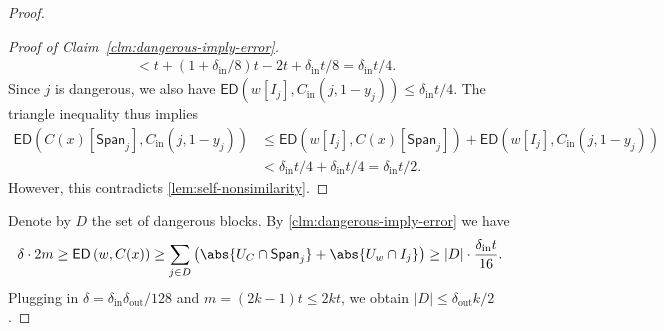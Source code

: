 \documentclass[10pt,a4paper]{article}
\theoremstyle{remark}
\newcommand{\tuple}[1]{\ensuremath{\left(#1\right)}}
\newcommand{\tp}{\tuple}
\newcommand{\ED}{\ensuremath{\mathsf{ED}}\xspace}%
\newcommand{\dout}{\delta_{\text{out}}}
\newcommand{\Cin}{C_{\text{in}}}
\newcommand{\din}{\delta_{\text{in}}}
\begin{document}
\begin{proof}
\begin{proof}[Proof of Claim~\ref{clm:dangerous-imply-error}]
\begin{align*}
			&< t + (1+\din/8)t - 2t + \din t/8 = \din t/4.
		\end{align*}
		Since $j$ is dangerous, we also have $\ED\tp{w[I_j], \Cin(j, 1-y_j)}\le \din t/4$. The triangle inequality thus implies
		\begin{align*}
			\ED\tp{C(x)[{\textsf{Span}_j}], \Cin(j, 1-y_j)} &\le \ED\tp{w[{I_j}], C(x)[{\textsf{Span}_j}]} + \ED\tp{w[{I_j}], \Cin(j, 1-y_j)}\\
			&< \din t/4 + \din t/4 = \din t/2.
		\end{align*}
		However, this contradicts \cref{lem:self-nonsimilarity}.
	\end{proof}
	
	Denote by $D$ the set of dangerous blocks. By \cref{clm:dangerous-imply-error} we have
	\begin{align*}
	\delta \cdot 2m \ge \ED\tp{w, C(x)} \ge \sum_{j \in D}\tp{\abs{U_C \cap \textsf{Span}_j} + \abs{U_w \cap I_j}} \ge |D| \cdot \frac{\din t}{16}.
	\end{align*}
	Plugging in $\delta = \din\dout/128$ and $m=(2k-1)t \leq 2kt$, we obtain $|D| \le \dout k/2$.
\end{proof}
\end{document}
